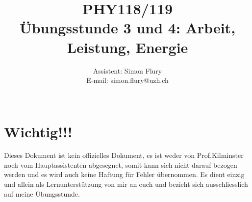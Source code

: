 \documentclass[12pt]{article}
\begin{document}
\title{PHY118/119 \\ {\bf Übungsstunde 3 und 4: Arbeit, Leistung, Energie}}
\author{Assistent: Simon Flury \\E-mail: simon.flury@uzh.ch\\\\ }
\maketitle

\section{Wichtig!!!}
Dieses Dokument ist kein offizielles Dokument, es ist weder von Prof.Kilminster noch vom Hauptassistenten abgesegnet, somit kann sich nicht darauf bezogen werden und es wird auch keine Haftung für Fehler übernommen. Es dient einzig und allein als Lernunterstützung von mir an euch und bezieht sich ausschliesslich auf meine Übungsstunde.
\end{document}
